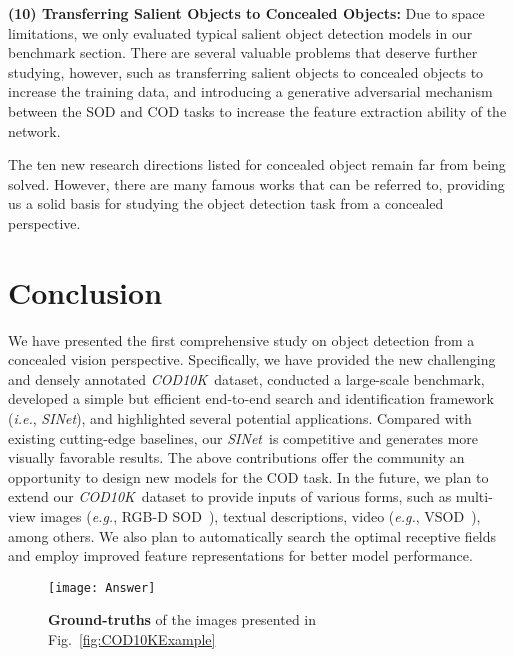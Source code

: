 \documentclass[10pt,journal,compsoc]{IEEEtran}
\def\ie{\emph{i.e.}}
\def\eg{\emph{e.g.}}
\newcommand{\figref}[1]{Fig.~\ref{#1}}
\def\ourdataset{\textit{COD10K}}
\def\ournewmodel{\emph{SINet}}
\begin{document}
\textbf{(10) Transferring Salient Objects to Concealed Objects:}
Due to space limitations, we only evaluated typical salient object detection 
models in our benchmark section. 
There are several valuable problems that deserve further studying, 
however, such as transferring salient objects to concealed objects 
to increase the training data, and introducing a generative adversarial 
mechanism between the SOD and COD tasks to 
increase the feature extraction ability of the network.

The ten new research directions listed for concealed object remain far 
from being solved. 
However, there are many famous works that can be referred to, 
providing us a solid basis for studying the object detection task from 
a concealed perspective. 

\section{Conclusion}\label{sec:Conclusion}

We have presented the first comprehensive study on object detection from 
a concealed vision perspective.
Specifically, we have provided the new challenging and densely annotated
\ourdataset~dataset, conducted a large-scale benchmark,
developed a simple but efficient end-to-end search and identification 
framework (\ie, \ournewmodel),
and highlighted several potential applications.
%
Compared with existing cutting-edge baselines, our \ournewmodel~is
competitive and generates more visually favorable results.
%
The above contributions offer the community an opportunity to design 
new models for the COD task.
%
In the future, we plan to extend our \ourdataset~dataset to provide 
inputs of various forms, such as multi-view images 
(\eg, RGB-D SOD~\cite{fu2021siamese,zhang2021uncertainty}), 
textual descriptions, video (\eg, VSOD~\cite{fan2019shifting}), among others.
%
We also plan to automatically search the optimal receptive fields 
\cite{gao2021global2local} and employ improved feature representations 
\cite{gao2021rbn} for better model performance.

\begin{figure}[t!]
  \centering
  \texttt{[image: Answer]}\\
  \vspace{-12pt}
  \caption{\textbf{Ground-truths} of the images presented in 
    \figref{fig:COD10KExample}
  }\label{fig:Answer}
\end{figure}
\end{document}
